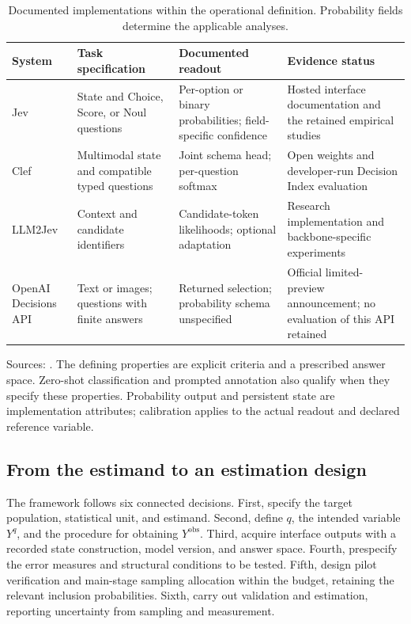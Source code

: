 \documentclass[11pt,a4paper]{article}
\begin{document}
\begin{table}[!htbp]
\centering\small
\caption{Documented implementations within the operational definition. Probability fields determine the applicable analyses.}\label{tab:interfaces}
\begin{tabularx}{\textwidth}{@{}L{2.25cm}YL{3.25cm}Y@{}}
\toprule
System & Task specification & Documented readout & Evidence status \\
\midrule
Jev & State and Choice, Score, or Noul questions & Per-option or binary probabilities; field-specific confidence & Hosted interface documentation and the retained empirical studies \\
Clef & Multimodal state and compatible typed questions & Joint schema head; per-question softmax & Open weights and developer-run Decision Index evaluation \\
LLM2Jev & Context and candidate identifiers & Candidate-token likelihoods; optional adaptation & Research implementation and backbone-specific experiments \\
OpenAI Decisions API & Text or images; questions with finite answers & Returned selection; probability schema unspecified & Official limited-preview announcement; no evaluation of this API retained \\
\bottomrule
\end{tabularx}
\vspace{0.3em}
\parbox{\textwidth}{\footnotesize Sources: \citet{typesafe-intro,cloudflare2026,liwagle2026,openai2026}. The defining properties are explicit criteria and a prescribed answer space. Zero-shot classification and prompted annotation also qualify when they specify these properties. Probability output and persistent state are implementation attributes; calibration applies to the actual readout and declared reference variable.}
\end{table}

\subsection{From the estimand to an estimation design}\label{sec:framework}

The framework follows six connected decisions. First, specify the target population, statistical unit, and estimand. Second, define $q$, the intended variable $Y^q$, and the procedure for obtaining $Y^{\mathrm{obs}}$. Third, acquire interface outputs with a recorded state construction, model version, and answer space. Fourth, prespecify the error measures and structural conditions to be tested. Fifth, design pilot verification and main-stage sampling allocation within the budget, retaining the relevant inclusion probabilities. Sixth, carry out validation and estimation, reporting uncertainty from sampling and measurement.
\end{document}
